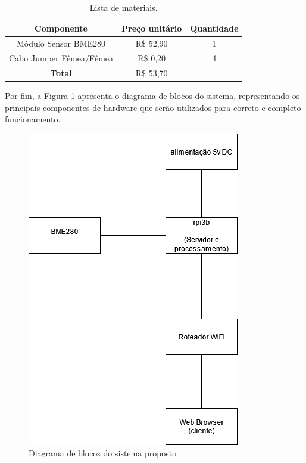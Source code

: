 \begin{table}[!htpb]
\caption{Lista de materiais.}
\label{tab:BOM}
\centering
\begin{tabular}{ccc}
\hline
\textbf{Componente} & \textbf{Preço unitário} & \textbf{Quantidade}\\
\hline 
Módulo Sensor BME280 & R\$ 52,90 & 1 \\
Cabo Jumper Fêmea/Fêmea & R\$ 0,20 & 4 \\
\hline
\textbf{Total} & R\$ 53,70 & \\
\hline
\end{tabular}
\end{table}

Por fim, a Figura \ref{fig:diagramabloco} apresenta o diagrama de blocos do sistema, representando os principais componentes de hardware que serão utilizados para correto e completo funcionamento.

\begin{figure}[!ht]
\centering
\includegraphics[width=.7\columnwidth]{figuras/diagramabloco.png}
\caption{Diagrama de blocos do sistema proposto}
\label{fig:diagramabloco}
\end{figure}

